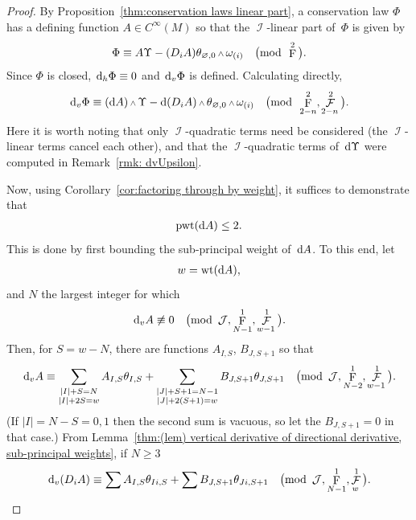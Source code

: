 \documentclass[10pt,a4paper]{amsart}
\DeclareMathOperator{\I}{\mathcal{I}}
\renewcommand{\d}{{\rm d}}
\renewcommand{\mod}[1]{\quad\big(\mathrm{mod\enspace} #1\big)}
\newcommand{\w}{{\mathchoice{\,{\scriptstyle\wedge}\,}{{\scriptstyle\wedge}}
 {{\scriptscriptstyle\wedge}}{{\scriptscriptstyle\wedge}}}}
\newcommand{\thetas}[1]{\theta_{#1}}
\newcommand{\thetanot}{\thetas{\varnothing,0}}
\newcommand{\omegas}[1]{\omega_{(#1)}}
\DeclareMathOperator{\pwf}{F}
\DeclareMathOperator{\swf}{\mathcal{F}}
\DeclareMathOperator{\wt}{\mathrm{wt}}
\DeclareMathOperator{\pwt}{\mathrm{pwt}}
\renewcommand{\dh}{\ensuremath{\hspace{1pt} \d_h}}
\newcommand{\dv}{\ensuremath{\hspace{1pt} \d_v}}
\newcommand{\cartTheta}{\mathcal{J}}
\newcommand{\cMinfty}{C^\infty(M)}
\numberwithin{equation}{section}
\begin{document}
\begin{proof}
 By Proposition~\ref{thm:conservation laws linear part}, a conservation law $\Phi$ has a defining function $A \in \cMinfty$ so that the $\I$-linear part of~$\Phi$ is given by
 \begin{gather*}
 \Phi \equiv A\Upsilon - (D_i A)\thetas{\varnothing,0}\w\omegas{i} \mod{\pwf^2} .
 \end{gather*}
 Since $\Phi$ is closed, $\dh\Phi \equiv 0$ and $\dv\Phi$ is defined.
 Calculating directly,
 \begin{gather}\label{eq: dvPhi}
 \dv\Phi \equiv (\d A)\w\Upsilon - \d(D_i A)\w\thetanot\w\omegas{i} \mod{\pwf^2_{2-n},\swf^2_{2-n}} .
 \end{gather}
 Here it is worth noting that only $\I$-quadratic terms need be considered (the $\I$-linear terms cancel each other), and that the $\I$-quadratic terms of~$\d\Upsilon$ were computed in Remark~\ref{rmk: dvUpsilon}.

 Now, using Corollary~\ref{cor:factoring through by weight}, it suffices to demonstrate that
 \begin{gather*}
 \pwt(\d A) \le 2 .
 \end{gather*}
 This is done by first bounding the sub-principal weight of~$\d A$.
 To this end, let
 \begin{gather*}
 w = \wt(\d A) ,
 \end{gather*}
 and $N$ the largest integer for which
 \begin{gather*}
 \dv A \not\equiv 0 \mod{\cartTheta, \pwf^1_{N-1}, \swf^1_{w-1}} .
 \end{gather*}
 Then, for $S = w-N$, there are functions $A_{I,S}$, $B_{J,S+1}$ so that
 \begin{gather*}
 \dv A \equiv \sum_{\substack{|I|+S = N \\ |I|+2S = w}} A_{I,S}\thetas{I,S} + \sum_{\substack{|J|+S+1 = N - 1 \\ |J|+2(S+1) = w}} B_{J,S+1}\thetas{J,S+1} \mod{\cartTheta, \pwf^1_{N-2}, \swf^1_{w-1}} .
 \end{gather*}
 (If $|I| = N-S = 0,1$ then the second sum is vacuous, so let the $B_{J,S+1} = 0$ in that case.)
 From Lemma~\ref{thm:(lem) vertical derivative of directional derivative, sub-principal weights}, if $N \ge 3$
 \begin{gather*}
 \dv(D_i A) \equiv \sum A_{I,S}\thetas{Ii,S} + \sum B_{J,S+1}\thetas{Ji,S+1} \mod{\cartTheta, \pwf^1_{N-1}, \swf^1_{w}} .
 \end{gather*}


\end{proof}
\end{document}
